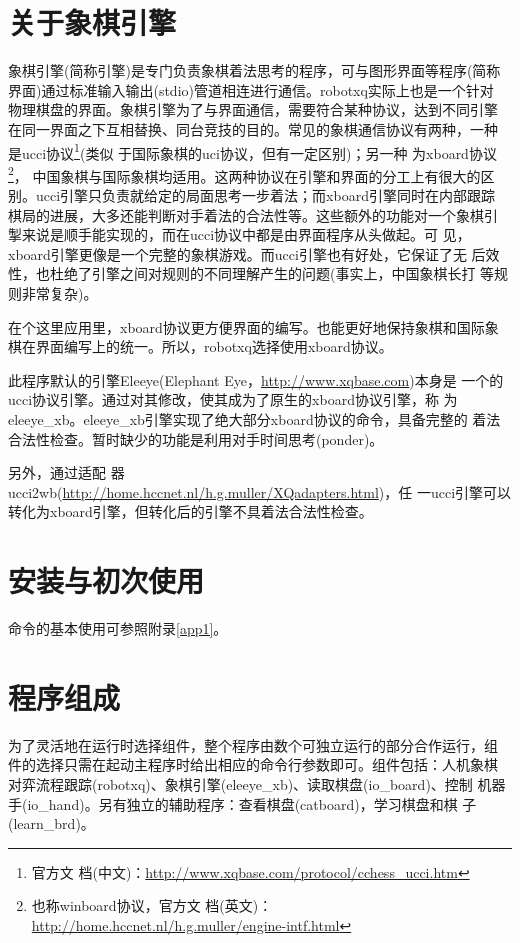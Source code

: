 \documentclass[a4paper]{article}
\begin{document}
\section{关于象棋引擎}
象棋引擎(简称引擎)是专门负责象棋着法思考的程序，可与图形界面等程序(简称
界面)通过标准输入输出(stdio)管道相连进行通信。robotxq实际上也是一个针对
物理棋盘的界面。象棋引擎为了与界面通信，需要符合某种协议，达到不同引擎
在同一界面之下互相替换、同台竞技的目的。常见的象棋通信协议有两种，一种
是ucci协议\footnote{官方文
  档(中文)：\url{http://www.xqbase.com/protocol/cchess_ucci.htm}}(类似
于国际象棋的uci协议，但有一定区别)；另一种
为xboard协议\footnote{也称winboard协议，官方文
  档(英文)：\url{http://home.hccnet.nl/h.g.muller/engine-intf.html}}，
中国象棋与国际象棋均适用。这两种协议在引擎和界面的分工上有很大的区
别。ucci引擎只负责就给定的局面思考一步着法；而xboard引擎同时在内部跟踪
棋局的进展，大多还能判断对手着法的合法性等。这些额外的功能对一个象棋引
掣来说是顺手能实现的，而在ucci协议中都是由界面程序从头做起。可
见，xboard引擎更像是一个完整的象棋游戏。而ucci引擎也有好处，它保证了无
后效性，也杜绝了引擎之间对规则的不同理解产生的问题(事实上，中国象棋长打
等规则非常复杂)。

在个这里应用里，xboard协议更方便界面的编写。也能更好地保持象棋和国际象
棋在界面编写上的统一。所以，robotxq选择使用xboard协议。

此程序默认的引擎Eleeye(Elephant Eye，\url{http://www.xqbase.com})本身是
一个的ucci协议引擎。通过对其修改，使其成为了原生的xboard协议引擎，称
为eleeye\_xb。eleeye\_xb引擎实现了绝大部分xboard协议的命令，具备完整的
着法合法性检查。暂时缺少的功能是利用对手时间思考(ponder)。

另外，通过适配
器ucci2wb(\url{http://home.hccnet.nl/h.g.muller/XQadapters.html})，任
一ucci引擎可以转化为xboard引擎，但转化后的引擎不具着法合法性检查。

\section{安装与初次使用}
命令的基本使用可参照附录\ref{app1}。

\section{程序组成}
为了灵活地在运行时选择组件，整个程序由数个可独立运行的部分合作运行，组
件的选择只需在起动主程序时给出相应的命令行参数即可。组件包括：人机象棋
对弈流程跟踪(robotxq)、象棋引擎(eleeye\_xb)、读取棋盘(io\_board)、控制
机器手(io\_hand)。另有独立的辅助程序：查看棋盘(catboard)，学习棋盘和棋
子(learn\_brd)。
\end{document}
